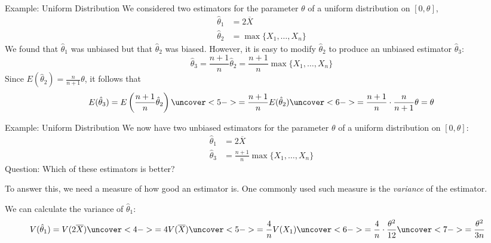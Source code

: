 \documentclass[t,handout]{beamer}
\begin{document}
        \begin{frame}{Example: Uniform Distribution}
        We considered two estimators for the parameter $\theta$ of a uniform distribution on $[0,\theta]$,
        \begin{align*}
        \hat\theta_1 &= 2\overline{X} \\
        \hat\theta_2 &= \max\{X_1,\dots,X_n\}
        \end{align*}
        \pause We found that $\hat\theta_1$ was unbiased but that $\hat\theta_2$ was biased. \pause However, it is easy to modify $\hat\theta_2$ to produce an unbiased estimator $\hat\theta_3$:
        $$\hat\theta_3 = \frac{n+1}n \hat\theta_2 = \frac{n+1}n\max\{X_1,\dots,X_n\}$$
        \pause Since $E(\hat\theta_2)=\frac n{n+1}\theta$, it follows that
        $$E(\hat\theta_3) = E\left(\frac{n+1}n\hat\theta_2\right) 
        \uncover<5->{= \frac{n+1}n E(\hat\theta_2) }
        \uncover<6->{= \frac{n+1}n\cdot\frac n{n+1}\theta = \theta}$$
        \end{frame}
        
        \begin{frame}{Example: Uniform Distribution}
        We now have two unbiased estimators for the parameter $\theta$ of a uniform distribution on $[0,\theta]$:
        \begin{align*}
        \hat\theta_1 &= 2\overline{X} \\
        \hat\theta_3 &= \frac{n+1}n\max\{X_1,\dots,X_n\}
        \end{align*}
        Question: Which of these estimators is better?
        
        \pause \vspace{.2cm}To answer this, we need a measure of how good an estimator is. One commonly used such measure is the \textit{variance} of the estimator. 
        
        \pause \vspace{.2cm}We can calculate the variance of $\hat\theta_1$:
        \begin{align*}
        V(\hat \theta_1) &= V(2\overline{X}) 
        \uncover<4->{= 4V(\overline{X}) }
        \uncover<5->{= \frac4nV(X_1) }
        \uncover<6->{= \frac4n\cdot \frac{\theta^2}{12}}
        \uncover<7->{ = \frac{\theta^2}{3n}}
        \end{align*}
        \end{frame}
        
\end{document}
